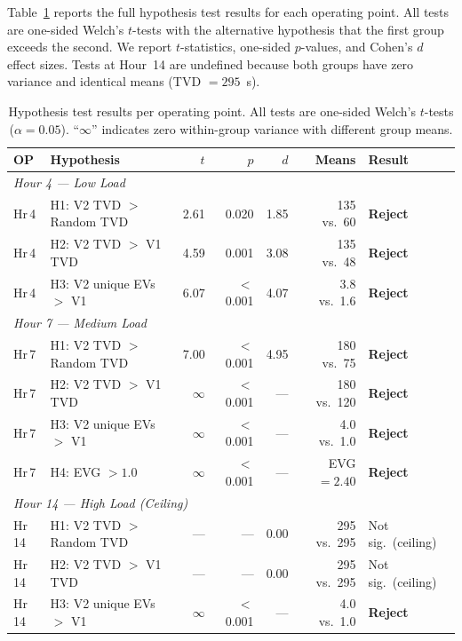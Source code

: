 Table~\ref{tab:stats} reports the full hypothesis test results for each operating point. All tests are one-sided Welch's $t$-tests with the alternative hypothesis that the first group exceeds the second. We report $t$-statistics, one-sided $p$-values, and Cohen's $d$ effect sizes. Tests at Hour~14 are undefined because both groups have zero variance and identical means (TVD $= 295$~s).

\begin{table}[t]
\centering
\caption{Hypothesis test results per operating point. All tests are one-sided Welch's $t$-tests ($\alpha = 0.05$). ``$\infty$'' indicates zero within-group variance with different group means.}
\label{tab:stats}
\scriptsize
\begin{tabular}{llrrrrl}
\toprule
\textbf{OP} & \textbf{Hypothesis} & \textbf{$t$} & \textbf{$p$} & \textbf{$d$} & \textbf{Means} & \textbf{Result} \\
\midrule
\multicolumn{7}{l}{\textit{Hour 4 --- Low Load}} \\
\midrule
Hr\,4 & H1: V2 TVD $>$ Random TVD       & 2.61     & 0.020  & 1.85  & 135 vs.\ 60  & \textbf{Reject} \\
Hr\,4 & H2: V2 TVD $>$ V1 TVD           & 4.59     & 0.001  & 3.08  & 135 vs.\ 48  & \textbf{Reject} \\
Hr\,4 & H3: V2 unique EVs $>$ V1        & 6.07     & $<$0.001 & 4.07 & 3.8 vs.\ 1.6 & \textbf{Reject} \\
\midrule
\multicolumn{7}{l}{\textit{Hour 7 --- Medium Load}} \\
\midrule
Hr\,7 & H1: V2 TVD $>$ Random TVD       & 7.00     & $<$0.001 & 4.95 & 180 vs.\ 75  & \textbf{Reject} \\
Hr\,7 & H2: V2 TVD $>$ V1 TVD           & $\infty$ & $<$0.001 & ---  & 180 vs.\ 120 & \textbf{Reject} \\
Hr\,7 & H3: V2 unique EVs $>$ V1        & $\infty$ & $<$0.001 & ---  & 4.0 vs.\ 1.0 & \textbf{Reject} \\
Hr\,7 & H4: EVG $> 1.0$                 & $\infty$ & $<$0.001 & ---  & EVG $= 2.40$ & \textbf{Reject} \\
\midrule
\multicolumn{7}{l}{\textit{Hour 14 --- High Load (Ceiling)}} \\
\midrule
Hr\,14 & H1: V2 TVD $>$ Random TVD      & --- & --- & 0.00 & 295 vs.\ 295 & Not sig.\ (ceiling) \\
Hr\,14 & H2: V2 TVD $>$ V1 TVD          & --- & --- & 0.00 & 295 vs.\ 295 & Not sig.\ (ceiling) \\
Hr\,14 & H3: V2 unique EVs $>$ V1       & $\infty$ & $<$0.001 & --- & 4.0 vs.\ 1.0 & \textbf{Reject} \\
\bottomrule
\end{tabular}
\end{table}

